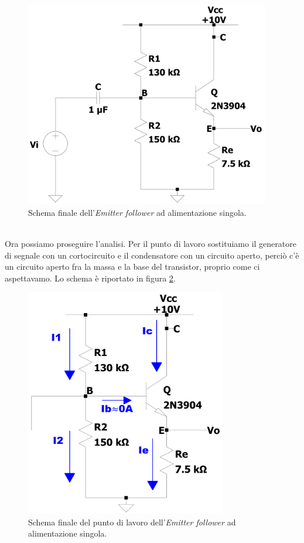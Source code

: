 \documentclass{report}
\begin{document}
\begin{figure}[h!]
\centering
\includegraphics[height=9cm]{immagini/EFv2_3}
\caption{Schema finale dell'\textit{Emitter follower} ad alimentazione singola.}
\label{figura:EFv2_3}
\end{figure}
\\\indent Ora possiamo proseguire l'analisi. Per il punto di lavoro sostituiamo il generatore di segnale con un cortocircuito e il condensatore con un circuito aperto, perciò c'è un circuito aperto fra la massa e la base del transistor, proprio come ci aspettavamo. Lo schema è riportato in figura \ref{figura:EFv2_3_pl}.
\begin{figure}[h]
\centering
\includegraphics[height=10cm]{immagini/EFv2_3_pl}
\caption{Schema finale del punto di lavoro dell'\textit{Emitter follower} ad alimentazione singola.}
\label{figura:EFv2_3_pl}
\end{figure}
\end{document}
